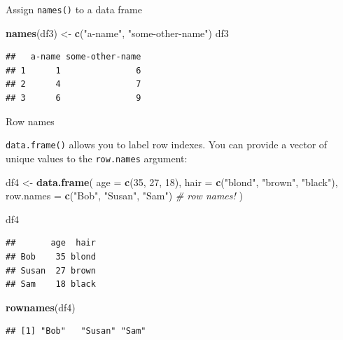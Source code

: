 \documentclass[ignorenonframetext,]{beamer}
\newenvironment{Shaded}{\begin{snugshade}}{\end{snugshade}}
\newcommand{\CommentTok}[1]{\textcolor[rgb]{0.56,0.35,0.01}{\textit{#1}}}
\newcommand{\DataTypeTok}[1]{\textcolor[rgb]{0.13,0.29,0.53}{#1}}
\newcommand{\DecValTok}[1]{\textcolor[rgb]{0.00,0.00,0.81}{#1}}
\newcommand{\KeywordTok}[1]{\textcolor[rgb]{0.13,0.29,0.53}{\textbf{#1}}}
\newcommand{\NormalTok}[1]{#1}
\newcommand{\StringTok}[1]{\textcolor[rgb]{0.31,0.60,0.02}{#1}}
\begin{document}
\begin{frame}[fragile]{Assign \texttt{names()} to a data frame}
\protect\hypertarget{assign-names-to-a-data-frame-1}{}

\begin{Shaded}
\begin{Highlighting}[]
\KeywordTok{names}\NormalTok{(df3) <-}\StringTok{ }\KeywordTok{c}\NormalTok{(}\StringTok{"a-name"}\NormalTok{, }\StringTok{"some-other-name"}\NormalTok{)}
\NormalTok{df3}
\end{Highlighting}
\end{Shaded}

\begin{verbatim}
##   a-name some-other-name
## 1      1               6
## 2      4               7
## 3      6               9
\end{verbatim}

\end{frame}

\begin{frame}[fragile]{Row names}
\protect\hypertarget{row-names}{}

\texttt{data.frame()} allows you to label row indexes. You can provide a
vector of unique values to the \texttt{row.names} argument:

\begin{Shaded}
\begin{Highlighting}[]
\NormalTok{df4 <-}\StringTok{ }\KeywordTok{data.frame}\NormalTok{(}
  \DataTypeTok{age =} \KeywordTok{c}\NormalTok{(}\DecValTok{35}\NormalTok{, }\DecValTok{27}\NormalTok{, }\DecValTok{18}\NormalTok{),}
  \DataTypeTok{hair =} \KeywordTok{c}\NormalTok{(}\StringTok{"blond"}\NormalTok{, }\StringTok{"brown"}\NormalTok{, }\StringTok{"black"}\NormalTok{),}
  \DataTypeTok{row.names =} \KeywordTok{c}\NormalTok{(}\StringTok{"Bob"}\NormalTok{, }\StringTok{"Susan"}\NormalTok{, }\StringTok{"Sam"}\NormalTok{) }\CommentTok{# row names!}
\NormalTok{) }

\NormalTok{df4}
\end{Highlighting}
\end{Shaded}

\begin{verbatim}
##       age  hair
## Bob    35 blond
## Susan  27 brown
## Sam    18 black
\end{verbatim}

\begin{Shaded}
\begin{Highlighting}[]
\KeywordTok{rownames}\NormalTok{(df4)}
\end{Highlighting}
\end{Shaded}

\begin{verbatim}
## [1] "Bob"   "Susan" "Sam"
\end{verbatim}

\end{frame}
\end{document}
